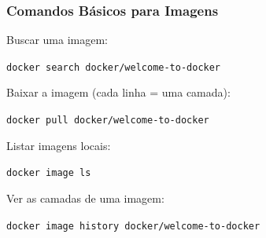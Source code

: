 \begin{frame}
  \frametitle{Comandos Básicos para Imagens}
  Buscar uma imagem:

  \vspace{0.3em}
  \texttt{docker search docker/welcome-to-docker}

  \vspace{0.5em}
  Baixar a imagem (cada linha = uma camada):

  \vspace{0.3em}
  \texttt{docker pull docker/welcome-to-docker}

  \vspace{0.5em}
  Listar imagens locais:

  \vspace{0.3em}
  \texttt{docker image ls}

  \vspace{0.5em}
  Ver as camadas de uma imagem:

  \vspace{0.3em}
  \texttt{docker image history docker/welcome-to-docker}
\end{frame}